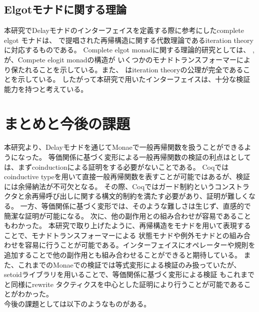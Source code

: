 \documentclass[japanese]{jssst_ppl}
\theoremstyle{definition}
\begin{document}
\subsection{Elgotモナドに関する理論}
本研究でDelayモナドのインターフェイスを定義する際に参考にしたcomplete elgot モナドは、
\cite{1993Bloom}で提唱された再帰構造に関する代数理論であるiteration theoryに対応するものである。
Complete elgot monadに関する理論的研究としては、
\cite{GONCHAROV2015183}, \cite{PIROG2014273}が、Compete elogit monadの構造が
いくつかのモナドトランスフォーマーにより保たれることを示している。また、
\cite{cacmfpo}はiteration theoryの公理が完全であることを示している。
したがって本研究で用いたインターフェイスは、十分な検証能力を持つと考えている。



\section{まとめと今後の課題}
本研究より、Delayモナドを通じてMonaeで一般再帰関数を扱うことができるようになった。
等価関係に基づく変形による一般再帰関数の検証の利点はとしては、まずcoinductionによる証明をする必要がないことである。
Coqではcoinductive typeを用いて直接一般再帰関数を表すことが可能ではあるが、検証には余帰納法が不可欠となる。
その際、Coqではガード制約というコンストラクタと余再帰呼び出しに関する構文的制約を満たす必要があり、証明が難しくなる。
一方、等価関係に基づく変形では、そのような難しさは生じず、直感的で簡潔な証明が可能になる。
次に、他の副作用との組み合わせが容易であることもわかった。
本研究で取り上げたように、再帰構造をモナドを用いて表現することで、モナドトランスフォーマーによる
状態モナドや例外モナドとの組み合わせを容易に行うことが可能である。インターフェイスにオペレーターや規則を追加することで他の副作用とも組み合わせることができると期待している。
また、これまでのMonaeでの検証では等式変形による検証のみ扱っていたが、setoidライブラリを用いることで、等価関係に基づく変形による検証
もこれまでと同様にrewrite タクティクスを中心とした証明により行うことが可能であることがわかった。\\
今後の課題としては以下のようなものがある。
\end{document}
